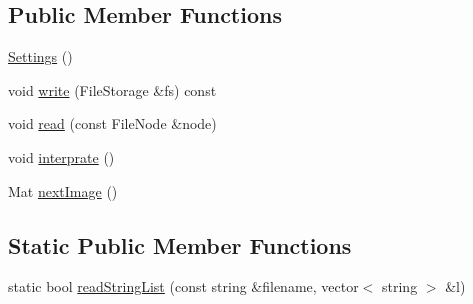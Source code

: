 \subsection*{Public Member Functions}
\begin{DoxyCompactItemize}
\item 
\hyperlink{classSettings_ab7169a6eefce79566dd07db3b1e5e967}{Settings} ()
\item 
void \hyperlink{classSettings_ae320e2f94798ba2de400f73a8110d412}{write} (File\-Storage \&fs) const 
\item 
void \hyperlink{classSettings_a2d7841f8441095032e0f3b7d20adfd3f}{read} (const File\-Node \&node)
\item 
void \hyperlink{classSettings_ac01c17bf3536e296f1076e50cdcb00cd}{interprate} ()
\item 
Mat \hyperlink{classSettings_a7701462e928f2425b342440fba9973e5}{next\-Image} ()
\end{DoxyCompactItemize}
\subsection*{Static Public Member Functions}
\begin{DoxyCompactItemize}
\item 
static bool \hyperlink{classSettings_ae57696cead99c4f0c528e33793866457}{read\-String\-List} (const string \&filename, vector$<$ string $>$ \&l)
\end{DoxyCompactItemize}

